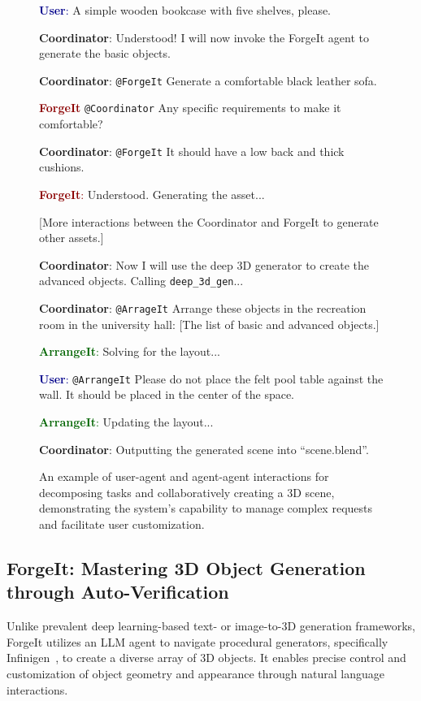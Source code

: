 \begin{figure}[t]
{\begin{tcolorbox}[colframe=black, colback=lightyellow, coltitle=black, left=2mm, right=2mm]
\textcolor{darkblue}{\textbf{User}:} A simple wooden bookcase with five shelves, please.

\textcolor{darkpurple}{\textbf{Coordinator}:} Understood! I will now invoke the ForgeIt agent to generate the basic objects.

\textcolor{darkpurple}{\textbf{Coordinator}:} \colorbox{darkyellow}{\texttt{@ForgeIt}} Generate a comfortable black leather sofa.

\textcolor{darkred}{\textbf{ForgeIt}} \colorbox{darkyellow}{\texttt{@Coordinator}} Any specific requirements to make it comfortable?

\textcolor{darkpurple}{\textbf{Coordinator}:} \colorbox{darkyellow}{\texttt{@ForgeIt}} It should have a low back and thick cushions.

\textcolor{darkred}{\textbf{ForgeIt}:} Understood. Generating the asset...

[More interactions between the Coordinator and ForgeIt to generate other assets.]

\textcolor{darkpurple}{\textbf{Coordinator}:} Now I will use the deep 3D generator to create the advanced objects. Calling \texttt{deep\_3d\_gen}...

\textcolor{darkpurple}{\textbf{Coordinator}:} \colorbox{darkyellow}{\texttt{@ArrageIt}} Arrange these objects in the recreation room in the university hall: [The list of basic and advanced objects.]

\textcolor{darkgreen}{\textbf{ArrangeIt}:} Solving for the layout...

\textcolor{darkblue}{\textbf{User}:} \colorbox{darkyellow}{\texttt{@ArrangeIt}} Please do not place the felt pool table against the wall. It should be placed in the center of the space.

\textcolor{darkgreen}{\textbf{ArrangeIt}:}  Updating the layout...

\textcolor{darkpurple}{\textbf{Coordinator}:} Outputting the generated scene into ``scene.blend''.

\end{tcolorbox} }
 \caption{An example of user-agent and agent-agent interactions for decomposing tasks and collaboratively creating a 3D scene, demonstrating the system's capability to manage complex requests and facilitate user customization.}
    \label{fig:conversation}
    \end{figure}





\subsection{ForgeIt: Mastering 3D Object Generation through Auto-Verification}
\label{sec:forgeit}
Unlike prevalent deep learning-based text- or image-to-3D generation frameworks, ForgeIt utilizes an LLM agent to navigate procedural generators, specifically Infinigen~\cite{infinigen2023infinite, infinigen2024indoors}, to create a diverse array of 3D objects. It enables precise control and customization of object geometry and appearance through natural language interactions.

